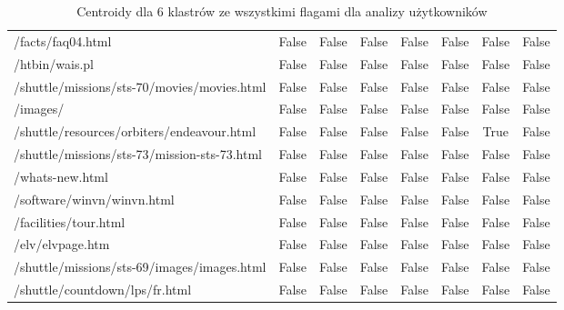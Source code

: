 \documentclass[../EDI_Task1_Karwowski_Kowalewski.tex]{subfiles}
\begin{document}
{{{\begin{table}[!htbp]
\begin{tabular}{|l|c|c|c|c|c|c|c|}
                    /facts/faq04.html                                &      False   &   False   &   False   &   False   &   False   &   False   &   False \\
                    /htbin/wais.pl                                   &      False   &   False   &   False   &   False   &   False   &   False   &   False \\
                    /shuttle/missions/sts-70/movies/movies.html      &      False   &   False   &   False   &   False   &   False   &   False   &   False \\
                    /images/                                         &      False   &   False   &   False   &   False   &   False   &   False   &   False \\
                    /shuttle/resources/orbiters/endeavour.html       &      False   &   False   &   False   &   False   &   False   &    True   &   False \\
                    /shuttle/missions/sts-73/mission-sts-73.html     &      False   &   False   &   False   &   False   &   False   &   False   &   False \\
                    /whats-new.html                                  &      False   &   False   &   False   &   False   &   False   &   False   &   False \\
                    /software/winvn/winvn.html                       &      False   &   False   &   False   &   False   &   False   &   False   &   False \\
                    /facilities/tour.html                            &      False   &   False   &   False   &   False   &   False   &   False   &   False \\
                    /elv/elvpage.htm                                 &      False   &   False   &   False   &   False   &   False   &   False   &   False \\
                    /shuttle/missions/sts-69/images/images.html      &      False   &   False   &   False   &   False   &   False   &   False   &   False \\
                    /shuttle/countdown/lps/fr.html                   &      False   &   False   &   False   &   False   &   False   &   False   &   False \\ \hline
                \end{tabular}
                \caption
                {Centroidy dla 6 klastrów ze wszystkimi flagami dla analizy użytkowników}
                \label{user_k_6}
            \end{table}

}}}
\end{document}
